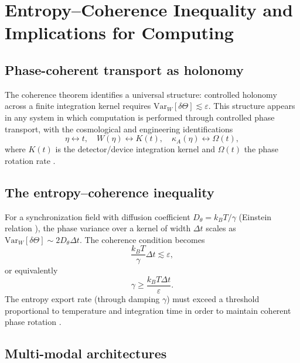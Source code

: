 \documentclass[12pt]{article}
\theoremstyle{definition}
\newcommand{\kA}{\kappa_A}
\newcommand{\VarW}{\mathrm{Var}_W}
\begin{document}
\section{Entropy--Coherence Inequality and Implications for Computing}
\label{sec:entropy}

\subsection{Phase-coherent transport as holonomy}

The coherence theorem identifies a universal structure: controlled
holonomy across a finite integration kernel requires
$\VarW[\delta\Theta]\lesssim\varepsilon$.
This structure appears in any system in which computation is performed
through controlled phase transport, with the cosmological and engineering
identifications
\begin{equation}
  \eta\leftrightarrow t,
  \quad
  W(\eta)\leftrightarrow K(t),
  \quad
  \kA(\eta)\leftrightarrow\Omega(t),
  \label{eq:cosmo_compute_map}
\end{equation}
where $K(t)$ is the detector/device integration kernel and $\Omega(t)$
the phase rotation rate \cite{Ozawa2019,Joannopoulos2008,Shen2010}.

\subsection{The entropy--coherence inequality}

For a synchronization field with diffusion coefficient
$D_\theta=k_BT/\gamma$ (Einstein relation \cite{Kubo1966}),
the phase variance over a kernel of width $\Delta t$ scales as
$\VarW[\delta\Theta]\sim2D_\theta\Delta t$.
The coherence condition becomes
\begin{equation}
  \frac{k_BT}{\gamma}\Delta t \lesssim \varepsilon,
  \label{eq:entropy_coherence}
\end{equation}
or equivalently
\begin{equation}
  \boxed{
  \gamma \geq \frac{k_BT\Delta t}{\varepsilon}.}
  \label{eq:damping_bound}
\end{equation}
The entropy export rate (through damping $\gamma$) must exceed a threshold
proportional to temperature and integration time in order to maintain
coherent phase rotation \cite{Seifert2012,Parrondo2015}.

\subsection{Multi-modal architectures}
\end{document}
